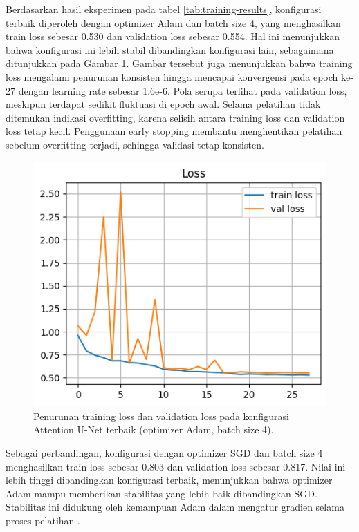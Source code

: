 \noindent Berdasarkan hasil eksperimen pada tabel \ref{tab:training-results}, konfigurasi terbaik diperoleh dengan optimizer Adam dan batch size 4, yang menghasilkan train loss sebesar 0.530 dan validation loss sebesar 0.554. Hal ini menunjukkan bahwa konfigurasi ini lebih stabil dibandingkan konfigurasi lain, sebagaimana ditunjukkan pada Gambar \ref{fig:loss_attention_terbaik}. Gambar tersebut juga menunjukkan bahwa training loss mengalami penurunan konsisten hingga mencapai konvergensi pada epoch ke-27 dengan learning rate sebesar 1.6e-6. Pola serupa terlihat pada validation loss, meskipun terdapat sedikit fluktuasi di epoch awal. Selama pelatihan tidak ditemukan indikasi overfitting, karena selisih antara training loss dan validation loss tetap kecil. Penggunaan early stopping membantu menghentikan pelatihan sebelum overfitting terjadi, sehingga validasi tetap konsisten.

\begin{figure}[H]
	\centering
	\includegraphics[scale=.8]{gambar/bab4/loss_adam_attention_u-net_4.png}
	\caption{Penurunan training loss dan validation loss pada konfigurasi Attention U-Net terbaik (optimizer Adam, batch size 4).}
	\label{fig:loss_attention_terbaik}
\end{figure}

\noindent Sebagai perbandingan, konfigurasi dengan optimizer SGD dan batch size 4 menghasilkan train loss sebesar 0.803 dan validation loss sebesar 0.817. Nilai ini lebih tinggi dibandingkan konfigurasi terbaik, menunjukkan bahwa optimizer Adam mampu memberikan stabilitas yang lebih baik dibandingkan SGD. Stabilitas ini didukung oleh kemampuan Adam dalam mengatur gradien selama proses pelatihan \cite{younisse_fine-tuning_2023}.


